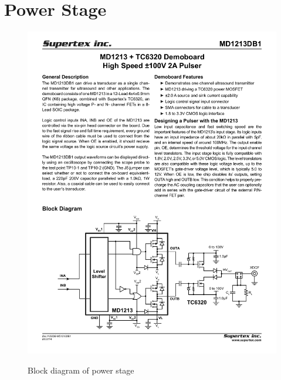\section{Power Stage}
\begin{figure}[htbp]
	\centering
	\includegraphics[width=\textwidth]{Figures/3_power_stage_block.pdf}
	\label{fig:3_power_stage}
	\caption{Block diagram of power stage \cite{MD1213DB1}}
\end{figure}
